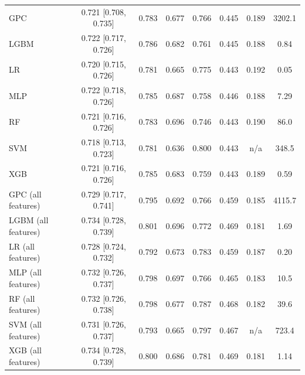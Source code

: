 \begin{tabular}{lccccccc}
\midrule
GPC & 0.721 [0.708, 0.735] & 0.783 & 0.677 & 0.766 & 0.445 & 0.189 & 3202.1 \\
LGBM & 0.722 [0.717, 0.726] & 0.786 & 0.682 & 0.761 & 0.445 & 0.188 & 0.84 \\
LR & 0.720 [0.715, 0.726] & 0.781 & 0.665 & 0.775 & 0.443 & 0.192 & 0.05 \\
MLP & 0.722 [0.718, 0.726] & 0.785 & 0.687 & 0.758 & 0.446 & 0.188 & 7.29 \\
RF & 0.721 [0.716, 0.726] & 0.783 & 0.696 & 0.746 & 0.443 & 0.190 & 86.0 \\
SVM & 0.718 [0.713, 0.723] & 0.781 & 0.636 & 0.800 & 0.443 & n/a & 348.5 \\
XGB & 0.721 [0.716, 0.726] & 0.785 & 0.683 & 0.759 & 0.443 & 0.189 & 0.59 \\
\midrule
GPC (all features) & 0.729 [0.717, 0.741] & 0.795 & 0.692 & 0.766 & 0.459 & 0.185 & 4115.7 \\
LGBM (all features) & 0.734 [0.728, 0.739] & 0.801 & 0.696 & 0.772 & 0.469 & 0.181 & 1.69 \\
LR (all features) & 0.728 [0.724, 0.732] & 0.792 & 0.673 & 0.783 & 0.459 & 0.187 & 0.20 \\
MLP (all features) & 0.732 [0.726, 0.737] & 0.798 & 0.697 & 0.766 & 0.465 & 0.183 & 10.5 \\
RF (all features) & 0.732 [0.726, 0.738] & 0.798 & 0.677 & 0.787 & 0.468 & 0.182 & 39.6 \\
SVM (all features) & 0.731 [0.726, 0.737] & 0.793 & 0.665 & 0.797 & 0.467 & n/a & 723.4 \\
XGB (all features) & 0.734 [0.728, 0.739] & 0.800 & 0.686 & 0.781 & 0.469 & 0.181 & 1.14 \\
\bottomrule
\end{tabular}